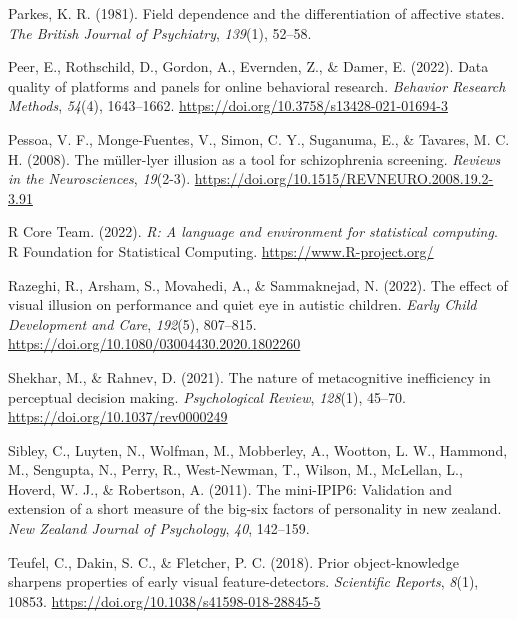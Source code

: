 \documentclass[
  man,floatsintext]{apa6}
\newlength{\cslhangindent}
\newlength{\cslentryspacingunit} %
\newenvironment{CSLReferences}[2] %
 {%
  \setlength{\parindent}{0pt}
  \ifodd #1
  \let\oldpar\par
  \def\par{\hangindent=\cslhangindent\oldpar}
  \fi
  \setlength{\parskip}{#2\cslentryspacingunit}
 }%
 {}
\begin{document}
\begin{CSLReferences}{1}{0}
\leavevmode{}%
Parkes, K. R. (1981). Field dependence and the differentiation of affective states. \emph{The British Journal of Psychiatry}, \emph{139}(1), 52--58.

\leavevmode{}%
Peer, E., Rothschild, D., Gordon, A., Evernden, Z., \& Damer, E. (2022). Data quality of platforms and panels for online behavioral research. \emph{Behavior Research Methods}, \emph{54}(4), 1643--1662. \url{https://doi.org/10.3758/s13428-021-01694-3}

\leavevmode{}%
Pessoa, V. F., Monge-Fuentes, V., Simon, C. Y., Suganuma, E., \& Tavares, M. C. H. (2008). The müller-lyer illusion as a tool for schizophrenia screening. \emph{Reviews in the Neurosciences}, \emph{19}(2-3). \url{https://doi.org/10.1515/REVNEURO.2008.19.2-3.91}

\leavevmode{}%
R Core Team. (2022). \emph{R: A language and environment for statistical computing}. R Foundation for Statistical Computing. \url{https://www.R-project.org/}

\leavevmode{}%
Razeghi, R., Arsham, S., Movahedi, A., \& Sammaknejad, N. (2022). The effect of visual illusion on performance and quiet eye in autistic children. \emph{Early Child Development and Care}, \emph{192}(5), 807--815. \url{https://doi.org/10.1080/03004430.2020.1802260}

\leavevmode{}%
Shekhar, M., \& Rahnev, D. (2021). The nature of metacognitive inefficiency in perceptual decision making. \emph{Psychological Review}, \emph{128}(1), 45--70. \url{https://doi.org/10.1037/rev0000249}

\leavevmode{}%
Sibley, C., Luyten, N., Wolfman, M., Mobberley, A., Wootton, L. W., Hammond, M., Sengupta, N., Perry, R., West-Newman, T., Wilson, M., McLellan, L., Hoverd, W. J., \& Robertson, A. (2011). The mini-IPIP6: Validation and extension of a short measure of the big-six factors of personality in new zealand. \emph{New Zealand Journal of Psychology}, \emph{40}, 142--159.

\leavevmode{}%
Teufel, C., Dakin, S. C., \& Fletcher, P. C. (2018). Prior object-knowledge sharpens properties of early visual feature-detectors. \emph{Scientific Reports}, \emph{8}(1), 10853. \url{https://doi.org/10.1038/s41598-018-28845-5}


\end{CSLReferences}
\end{document}
